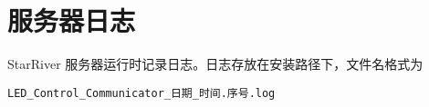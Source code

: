 \section{服务器日志}\label{ux670dux52a1ux5668ux65e5ux5fd7}

StarRiver 服务器运行时记录日志。日志存放在安装路径下，文件名格式为

\begin{verbatim}
LED_Control_Communicator_日期_时间.序号.log
\end{verbatim}
